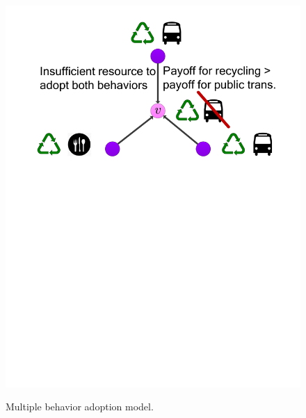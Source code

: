 \documentclass{article}
\begin{document}
\begin{figure}[htb]
{\includegraphics[viewport=1.75in 4in 7in 11in, width=\linewidth]{figs/timeline-4a}}%
\hspace{.2\linewidth}%
\parbox[][][t]{.3\linewidth}{%
}
\caption{Multiple behavior adoption model.}
\end{figure}
\end{document}

